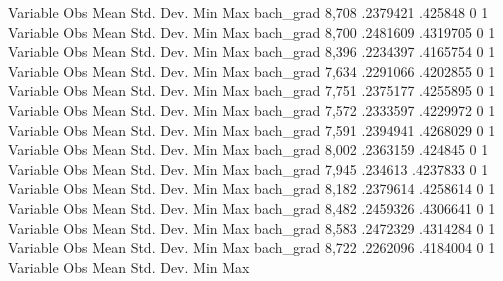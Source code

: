 {\smallskip}
    Variable {\VBAR}        Obs        Mean    Std. Dev.       Min        Max
   bach_grad {\VBAR}      8,708    .2379421     .425848          0          1
{\smallskip}
    Variable {\VBAR}        Obs        Mean    Std. Dev.       Min        Max
   bach_grad {\VBAR}      8,700    .2481609    .4319705          0          1
{\smallskip}
    Variable {\VBAR}        Obs        Mean    Std. Dev.       Min        Max
   bach_grad {\VBAR}      8,396    .2234397    .4165754          0          1
{\smallskip}
    Variable {\VBAR}        Obs        Mean    Std. Dev.       Min        Max
   bach_grad {\VBAR}      7,634    .2291066    .4202855          0          1
{\smallskip}
    Variable {\VBAR}        Obs        Mean    Std. Dev.       Min        Max
   bach_grad {\VBAR}      7,751    .2375177    .4255895          0          1
{\smallskip}
    Variable {\VBAR}        Obs        Mean    Std. Dev.       Min        Max
   bach_grad {\VBAR}      7,572    .2333597    .4229972          0          1
{\smallskip}
    Variable {\VBAR}        Obs        Mean    Std. Dev.       Min        Max
   bach_grad {\VBAR}      7,591    .2394941    .4268029          0          1
{\smallskip}
    Variable {\VBAR}        Obs        Mean    Std. Dev.       Min        Max
   bach_grad {\VBAR}      8,002    .2363159     .424845          0          1
{\smallskip}
    Variable {\VBAR}        Obs        Mean    Std. Dev.       Min        Max
   bach_grad {\VBAR}      7,945     .234613    .4237833          0          1
{\smallskip}
    Variable {\VBAR}        Obs        Mean    Std. Dev.       Min        Max
   bach_grad {\VBAR}      8,182    .2379614    .4258614          0          1
{\smallskip}
    Variable {\VBAR}        Obs        Mean    Std. Dev.       Min        Max
   bach_grad {\VBAR}      8,482    .2459326    .4306641          0          1
{\smallskip}
    Variable {\VBAR}        Obs        Mean    Std. Dev.       Min        Max
   bach_grad {\VBAR}      8,583    .2472329    .4314284          0          1
{\smallskip}
    Variable {\VBAR}        Obs        Mean    Std. Dev.       Min        Max
   bach_grad {\VBAR}      8,722    .2262096    .4184004          0          1
{\smallskip}
    Variable {\VBAR}        Obs        Mean    Std. Dev.       Min        Max
